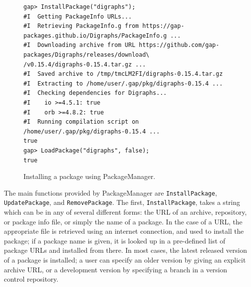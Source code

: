 \begin{figure}[!ht]
    \centering
    {\tiny
\begin{verbatim}
gap> InstallPackage("digraphs");
#I  Getting PackageInfo URLs...
#I  Retrieving PackageInfo.g from https://gap-packages.github.io/Digraphs/PackageInfo.g ...
#I  Downloading archive from URL https://github.com/gap-packages/Digraphs/releases/download\
/v0.15.4/digraphs-0.15.4.tar.gz ...
#I  Saved archive to /tmp/tmcLM2FI/digraphs-0.15.4.tar.gz
#I  Extracting to /home/user/.gap/pkg/digraphs-0.15.4 ...
#I  Checking dependencies for Digraphs...
#I    io >=4.5.1: true
#I    orb >=4.8.2: true
#I  Running compilation script on /home/user/.gap/pkg/digraphs-0.15.4 ...
true
gap> LoadPackage("digraphs", false);
true
\end{verbatim}
    }
    \caption{Installing a package using {\sf PackageManager}.}
    \label{fig:pkgman-sample-b}
\end{figure}

The main functions provided by {\sf PackageManager} are \texttt{InstallPackage},
\texttt{UpdatePackage}, and \texttt{RemovePackage}.  The first,
\texttt{InstallPackage}, takes a string which can be in any of several different
forms: the URL of an archive, repository, or package info file, or simply the
name of a package.  In the case of a URL, the appropriate file is retrieved
using an internet connection, and used to install the package; if a package name
is given, it is looked up in a pre-defined list of package URLs and installed
from there.  In most cases, the latest released version of a package is
installed; a user can specify an older version by giving an explicit archive
URL, or a development version by specifying a branch in a
version control repository.  %

